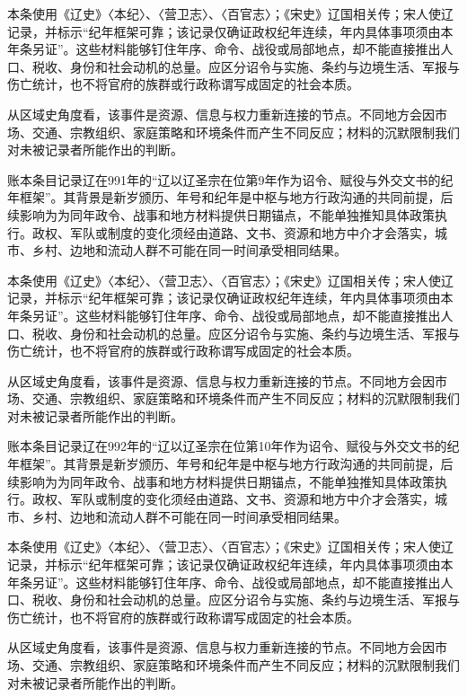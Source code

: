 本条使用《辽史》〈本纪〉、〈营卫志〉、〈百官志〉；《宋史》辽国相关传；宋人使辽记录，并标示“纪年框架可靠；该记录仅确证政权纪年连续，年内具体事项须由本年条另证”。这些材料能够钉住年序、命令、战役或局部地点，却不能直接推出人口、税收、身份和社会动机的总量。应区分诏令与实施、条约与边境生活、军报与伤亡统计，也不将官府的族群或行政称谓写成固定的社会本质。

从区域史角度看，该事件是资源、信息与权力重新连接的节点。不同地方会因市场、交通、宗教组织、家庭策略和环境条件而产生不同反应；材料的沉默限制我们对未被记录者所能作出的判断。

账本条目记录辽在991年的“辽以辽圣宗在位第9年作为诏令、赋役与外交文书的纪年框架”。其背景是新岁颁历、年号和纪年是中枢与地方行政沟通的共同前提，后续影响为为同年政令、战事和地方材料提供日期锚点，不能单独推知具体政策执行。政权、军队或制度的变化须经由道路、文书、资源和地方中介才会落实，城市、乡村、边地和流动人群不可能在同一时间承受相同结果。

本条使用《辽史》〈本纪〉、〈营卫志〉、〈百官志〉；《宋史》辽国相关传；宋人使辽记录，并标示“纪年框架可靠；该记录仅确证政权纪年连续，年内具体事项须由本年条另证”。这些材料能够钉住年序、命令、战役或局部地点，却不能直接推出人口、税收、身份和社会动机的总量。应区分诏令与实施、条约与边境生活、军报与伤亡统计，也不将官府的族群或行政称谓写成固定的社会本质。

从区域史角度看，该事件是资源、信息与权力重新连接的节点。不同地方会因市场、交通、宗教组织、家庭策略和环境条件而产生不同反应；材料的沉默限制我们对未被记录者所能作出的判断。

账本条目记录辽在992年的“辽以辽圣宗在位第10年作为诏令、赋役与外交文书的纪年框架”。其背景是新岁颁历、年号和纪年是中枢与地方行政沟通的共同前提，后续影响为为同年政令、战事和地方材料提供日期锚点，不能单独推知具体政策执行。政权、军队或制度的变化须经由道路、文书、资源和地方中介才会落实，城市、乡村、边地和流动人群不可能在同一时间承受相同结果。

本条使用《辽史》〈本纪〉、〈营卫志〉、〈百官志〉；《宋史》辽国相关传；宋人使辽记录，并标示“纪年框架可靠；该记录仅确证政权纪年连续，年内具体事项须由本年条另证”。这些材料能够钉住年序、命令、战役或局部地点，却不能直接推出人口、税收、身份和社会动机的总量。应区分诏令与实施、条约与边境生活、军报与伤亡统计，也不将官府的族群或行政称谓写成固定的社会本质。

从区域史角度看，该事件是资源、信息与权力重新连接的节点。不同地方会因市场、交通、宗教组织、家庭策略和环境条件而产生不同反应；材料的沉默限制我们对未被记录者所能作出的判断。

